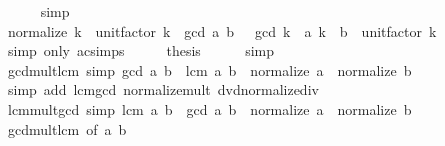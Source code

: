 \begin{isabellebody}
\ \ \ \ \isamarkupfalse%
\ simp\isanewline
\ \ \isamarkupfalse%
\ \isamarkupfalse%
\ {\isachardoublequoteopen}normalize\ k\ {\isacharasterisk}{\kern0pt}\ unit{\isacharunderscore}{\kern0pt}factor\ k\ {\isacharasterisk}{\kern0pt}\ gcd\ a\ b\ \ {\isacharequal}{\kern0pt}\ gcd\ {\isacharparenleft}{\kern0pt}k\ {\isacharasterisk}{\kern0pt}\ a{\isacharparenright}{\kern0pt}\ {\isacharparenleft}{\kern0pt}k\ {\isacharasterisk}{\kern0pt}\ b{\isacharparenright}{\kern0pt}\ {\isacharasterisk}{\kern0pt}\ unit{\isacharunderscore}{\kern0pt}factor\ k{\isachardoublequoteclose}\isanewline
\ \ \ \ \isamarkupfalse%
\ {\isacharparenleft}{\kern0pt}simp\ only{\isacharcolon}{\kern0pt}\ ac{\isacharunderscore}{\kern0pt}simps{\isacharparenright}{\kern0pt}\isanewline
\ \ \isamarkupfalse%
\ \isamarkupfalse%
\ {\isacharquery}{\kern0pt}thesis\isanewline
\ \ \ \ \isamarkupfalse%
\ simp\isanewline
{}\isamarkupfalse%
%
\endisatagproof
{\isafoldproof}%
%
\isadelimproof
\isanewline
%
\endisadelimproof
\isanewline
{}\isamarkupfalse%
\ gcd{\isacharunderscore}{\kern0pt}mult{\isacharunderscore}{\kern0pt}lcm\ {\isacharbrackleft}{\kern0pt}simp{\isacharbrackright}{\kern0pt}{\isacharcolon}{\kern0pt}\ {\isachardoublequoteopen}gcd\ a\ b\ {\isacharasterisk}{\kern0pt}\ lcm\ a\ b\ {\isacharequal}{\kern0pt}\ normalize\ a\ {\isacharasterisk}{\kern0pt}\ normalize\ b{\isachardoublequoteclose}\isanewline
%
\isadelimproof
\ \ %
\endisadelimproof
%
\isatagproof
{}\isamarkupfalse%
\ {\isacharparenleft}{\kern0pt}simp\ add{\isacharcolon}{\kern0pt}\ lcm{\isacharunderscore}{\kern0pt}gcd\ normalize{\isacharunderscore}{\kern0pt}mult\ dvd{\isacharunderscore}{\kern0pt}normalize{\isacharunderscore}{\kern0pt}div{\isacharparenright}{\kern0pt}%
\endisatagproof
{\isafoldproof}%
%
\isadelimproof
\isanewline
%
\endisadelimproof
\isanewline
{}\isamarkupfalse%
\ lcm{\isacharunderscore}{\kern0pt}mult{\isacharunderscore}{\kern0pt}gcd\ {\isacharbrackleft}{\kern0pt}simp{\isacharbrackright}{\kern0pt}{\isacharcolon}{\kern0pt}\ {\isachardoublequoteopen}lcm\ a\ b\ {\isacharasterisk}{\kern0pt}\ gcd\ a\ b\ {\isacharequal}{\kern0pt}\ normalize\ a\ {\isacharasterisk}{\kern0pt}\ normalize\ b{\isachardoublequoteclose}\isanewline
%
\isadelimproof
\ \ %
\endisadelimproof
%
\isatagproof
{}\isamarkupfalse%
\ gcd{\isacharunderscore}{\kern0pt}mult{\isacharunderscore}{\kern0pt}lcm\ {\isacharbrackleft}{\kern0pt}of\ a\ b{\isacharbrackright}{\kern0pt}\ \isamarkupfalse%

\end{isabellebody}
